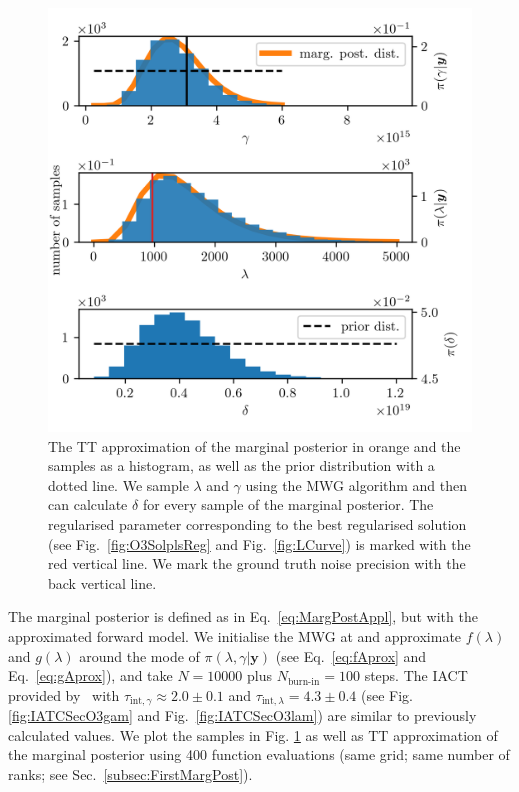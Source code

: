 \begin{figure}[ht!]
	\centering
	\includegraphics{secMargO3Res.png}
	\caption[Marginal posterior histograms and TT approximation as well as hyper-prior distribution.]{The TT approximation of the marginal posterior in orange and the samples as a histogram, as well as the prior distribution with a dotted line. We sample $\lambda$ and $\gamma$ using the MWG algorithm and then can calculate $\delta$ for every sample of the marginal posterior. The regularised parameter corresponding to the best regularised solution (see Fig.~\ref{fig:O3SolplsReg} and Fig.~\ref{fig:LCurve}) is marked with the red vertical line. We mark the ground truth noise precision with the back vertical line.}
	\label{fig:MargPostHistTT}
\end{figure}
The marginal posterior is defined as in Eq.~\ref{eq:MargPostAppl}, but with the approximated forward model.
We initialise the MWG at and approximate $f(\lambda)$ and $g(\lambda)$ around the mode of $\pi(\lambda,\gamma| \bm{y})$ (see Eq.~\ref{eq:fAprox} and Eq.~\ref{eq:gAprox}), and take $N = 10000$ plus $N_{\text{burn-in}} = 100$ steps.
The IACT provided by~\cite{drikHesse} with $\tau_{\text{int}, \gamma} \approx 2.0 \pm 0.1$ and $\tau_{\text{int}, \lambda} = 4.3 \pm 0.4 $ (see Fig. \ref{fig:IATCSecO3gam} and Fig.~\ref{fig:IATCSecO3lam}) are similar to previously calculated values.
We plot the samples in Fig. \ref{fig:MargPostHistTT} as well as TT approximation of the marginal posterior using 400 function evaluations (same grid; same number of ranks; see Sec.~\ref{subsec:FirstMargPost}).

